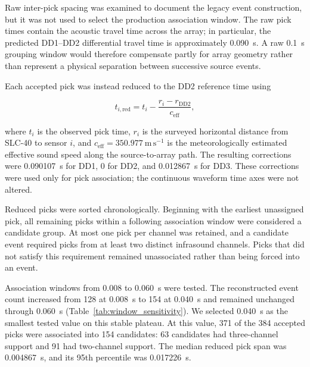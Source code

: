 \documentclass[11pt]{article}
\begin{document}
Raw inter-pick spacing was examined to document the legacy event construction,
but it was not used to select the production association window. The raw pick
times contain the acoustic travel time across the array; in particular, the
predicted DD1--DD2 differential travel time is approximately 0.090~s. A raw
0.1~s grouping window would therefore compensate partly for array geometry
rather than represent a physical separation between successive source events.

Each accepted pick was instead reduced to the DD2 reference time using

\begin{equation}
t_{i,\mathrm{red}}
=
t_i-
\frac{r_i-r_{\mathrm{DD2}}}{c_{\mathrm{eff}}},
\label{eq:reduced_time}
\end{equation}

where \(t_i\) is the observed pick time, \(r_i\) is the surveyed horizontal
distance from SLC-40 to sensor \(i\), and
\(c_{\mathrm{eff}}=350.977~\mathrm{m\,s^{-1}}\) is the meteorologically
estimated effective sound speed along the source-to-array path. The resulting
corrections were 0.090107~s for DD1, 0 for DD2, and 0.012867~s for DD3. These
corrections were used only for pick association; the continuous waveform time
axes were not altered.

Reduced picks were sorted chronologically. Beginning with the earliest
unassigned pick, all remaining picks within a following association window
were considered a candidate group. At most one pick per channel was retained,
and a candidate event required picks from at least two distinct infrasound
channels. Picks that did not satisfy this requirement remained unassociated
rather than being forced into an event.

Association windows from 0.008 to 0.060~s were tested. The reconstructed event
count increased from 128 at 0.008~s to 154 at 0.040~s and remained unchanged
through 0.060~s (Table~\ref{tab:window_sensitivity}). We selected 0.040~s as
the smallest tested value on this stable plateau. At this value, 371 of the
384 accepted picks were associated into 154 candidates: 63 candidates had
three-channel support and 91 had two-channel support. The median reduced pick
span was 0.004867~s, and its 95th percentile was 0.017226~s.
\end{document}
